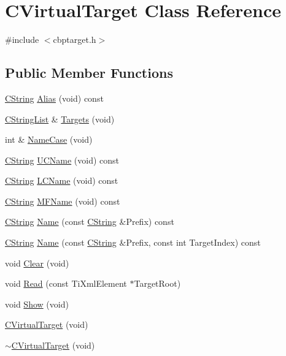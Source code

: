 \hypertarget{classCVirtualTarget}{\section{C\-Virtual\-Target Class Reference}
\label{classCVirtualTarget}
}


{\ttfamily \#include $<$cbptarget.\-h$>$}

\subsection*{Public Member Functions}
\begin{DoxyCompactItemize}
\item 
\hyperlink{classCString}{C\-String} \hyperlink{classCVirtualTarget_aacdede8c30ecdebfae457326c3712d42}{Alias} (void) const 
\item 
\hyperlink{classCStringList}{C\-String\-List} \& \hyperlink{classCVirtualTarget_a637c438565ce1b717f219bd4169ec874}{Targets} (void)
\item 
int \& \hyperlink{classCVirtualTarget_a582370b2c5e0ab86a71d3bdacc3e0339}{Name\-Case} (void)
\item 
\hyperlink{classCString}{C\-String} \hyperlink{classCVirtualTarget_adf668783851d9143a05e40d29860871d}{U\-C\-Name} (void) const 
\item 
\hyperlink{classCString}{C\-String} \hyperlink{classCVirtualTarget_a47ae0c75599b90d4b40fc6062d53422c}{L\-C\-Name} (void) const 
\item 
\hyperlink{classCString}{C\-String} \hyperlink{classCVirtualTarget_a350d0da4afab48f31dafffea5ae0737d}{M\-F\-Name} (void) const 
\item 
\hyperlink{classCString}{C\-String} \hyperlink{classCVirtualTarget_a9fa530b2aab56c730a217a2c606646ec}{Name} (const \hyperlink{classCString}{C\-String} \&Prefix) const 
\item 
\hyperlink{classCString}{C\-String} \hyperlink{classCVirtualTarget_a3559c4a137a2f3d59a66d9ade6206a99}{Name} (const \hyperlink{classCString}{C\-String} \&Prefix, const int Target\-Index) const 
\item 
void \hyperlink{classCVirtualTarget_aefeb9fb65294dff4f4bdd27cfc73808c}{Clear} (void)
\item 
void \hyperlink{classCVirtualTarget_a26e64a8d28d2bb82eaa860909d9e396c}{Read} (const Ti\-Xml\-Element $\ast$Target\-Root)
\item 
void \hyperlink{classCVirtualTarget_a011fb63a9fcbd1804533e171a46d03c4}{Show} (void)
\item 
\hyperlink{classCVirtualTarget_ae2eb62fc00aa8187b6c8ffa674cded5f}{C\-Virtual\-Target} (void)
\item 
\hyperlink{classCVirtualTarget_a77735340f76195d45d8b67f0eb699d57}{$\sim$\-C\-Virtual\-Target} (void)
\end{DoxyCompactItemize}
